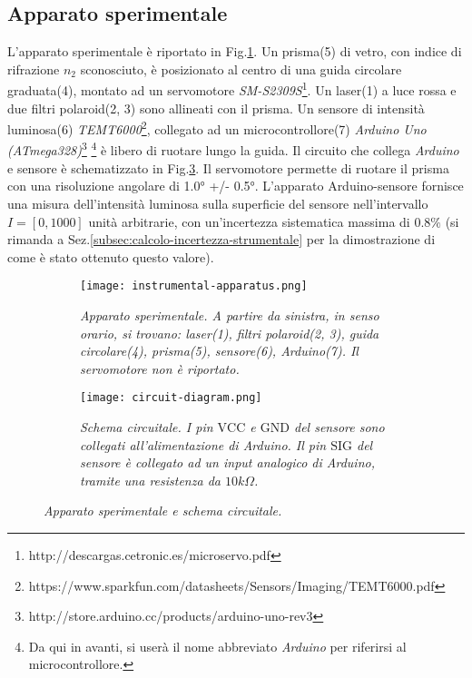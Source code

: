 \subsection{Apparato sperimentale}\label{subsec:apparato-sperimentale}
  L’apparato sperimentale è riportato in Fig.\ref{fig:apparato-strumentale}.
  Un prisma(5) di vetro, con indice di rifrazione $n_2$ sconosciuto, è posizionato al centro di una guida circolare graduata(4),
  montato ad un servomotore \emph{SM-S2309S}\footnote{http://descargas.cetronic.es/microservo.pdf}.
  Un laser(1) a luce rossa e due filtri polaroid(2, 3) sono
  allineati con il prisma. Un sensore di intensità luminosa(6) \emph{TEMT6000}\footnote{https://www.sparkfun.com/datasheets/Sensors/Imaging/TEMT6000.pdf},
  collegato ad un microcontrollore(7) \emph{Arduino Uno (ATmega328)}\footnote{http://store.arduino.cc/products/arduino-uno-rev3}%
  \footnote{Da qui in avanti, si userà il nome abbreviato \emph{Arduino} per riferirsi al microcontrollore.}
  è libero di ruotare lungo la guida.
  Il circuito che collega \emph{Arduino} e sensore è schematizzato in Fig.\ref{fig:diagramma-circuito}.
  Il servomotore permette di ruotare il prisma con una risoluzione angolare di 1.0° +/- 0.5°.
  L'apparato Arduino-sensore fornisce una misura dell'intensità luminosa
  sulla superficie del sensore nell'intervallo $I = [0, 1000]$ unità arbitrarie,
  con un'incertezza sistematica massima di $0.8\%$ (si rimanda a Sez.\ref{subsec:calcolo-incertezza-strumentale}
  per la dimostrazione di come è stato ottenuto questo valore).
%
  \begin{figure}[h]
    \centering
    \begin{subfigure}{.4\textwidth}
      \texttt{[image: instrumental-apparatus.png]}
      \caption{
        \emph{
          Apparato sperimentale. A partire da sinistra, in senso orario,
          si trovano: laser(1), filtri polaroid(2, 3), guida circolare(4),
          prisma(5), sensore(6), Arduino(7). Il servomotore non è riportato.
        }
      }
      \label{fig:apparato-strumentale}
    \end{subfigure}%
    \hspace{20mm}
    \begin{subfigure}{.4\textwidth}
      \texttt{[image: circuit-diagram.png]}
      \caption{
        \emph{
          Schema circuitale. I pin $\text{VCC}$ e $\text{GND}$ del sensore sono collegati
          all'alimentazione di Arduino. Il pin $\text{SIG}$
          del sensore è collegato ad un input analogico di Arduino, tramite una
          resistenza da $10k\Omega$.
        }
      }
      \label{fig:diagramma-circuito}
    \end{subfigure}
    \caption{\emph{Apparato sperimentale e schema circuitale.}}
  \end{figure}
%

